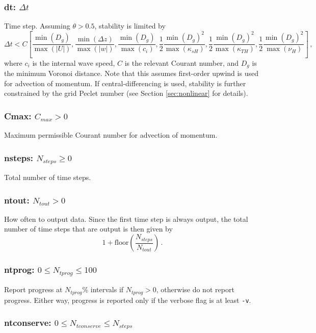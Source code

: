 \subsubsection{dt: $\Delta t$} \label{sec:dt}

Time step. Assuming $\theta>0.5$, stability is limited by
\[
\Delta t < C\left[\frac{\min(D_g)}{\max(|U|)},\frac{\min(\Delta z)}{\max(|w|)},
\frac{\min(D_g)}{\max(c_i)},
\frac{1}{2}\frac{\min(D_g)^2}{\max(\kappa_{sH})},
\frac{1}{2}\frac{\min(D_g)^2}{\max(\kappa_{TH})},
\frac{1}{2}\frac{\min(D_g)^2}{\max(\nu_{H})}
\right]\,,
\]
where $c_i$ is the internal wave speed, $C$ is the relevant Courant number, and $D_g$
is the minimum Voronoi distance.  Note that this assumes first-order upwind is used
for advection of momentum.  If central-differencing is used, stability is further
constrained by the grid Peclet number (see Section \ref{sec:nonlinear} for details).

\subsubsection{Cmax: $C_{max}>0$}

Maximum permissible Courant number for advection of momentum.  

\subsubsection{nsteps: $N_{steps}\ge 0$}

Total number of time steps. 


\subsubsection{ntout: $N_{tout}> 0$}

How often to output data.  Since the first time step is always output, 
the total number of time steps that are output is then given
by
\[
1+\mbox{floor}\left(\frac{N_{steps}}{N_{tout}}\right)\,.
\]


\subsubsection{ntprog: $0\le N_{tprog}\le 100$}

Report progress at $N_{tprog}$\% intervals if $N_{tprog}>0$, otherwise do not report
progress.  Either way, progress is reported only if the verbose flag is at least \verb+-v+.

\subsubsection{ntconserve: $0\le N_{tconserve}\le N_{steps}$}

